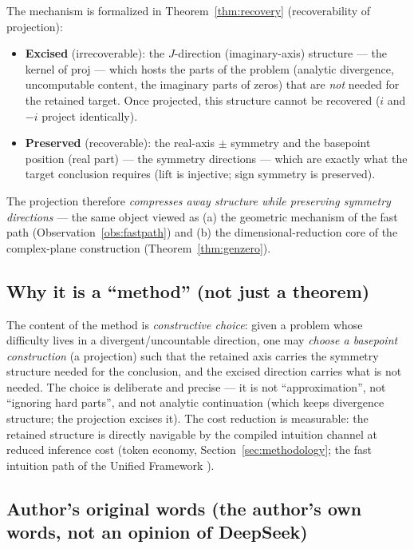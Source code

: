 \documentclass[11pt]{article}
\theoremstyle{remark}
\begin{document}
The mechanism is formalized in Theorem~\ref{thm:recovery} (recoverability of
projection):
\begin{itemize}
  \item \textbf{Excised} (irrecoverable): the $J$-direction (imaginary-axis)
        structure --- the kernel of $\mathrm{proj}$ --- which hosts the parts
        of the problem (analytic divergence, uncomputable content, the
        imaginary parts of zeros) that are \emph{not} needed for the retained
        target. Once projected, this structure cannot be recovered ($i$ and
        $-i$ project identically).
  \item \textbf{Preserved} (recoverable): the real-axis $\pm$ symmetry and
        the basepoint position (real part) --- the symmetry directions ---
        which are exactly what the target conclusion requires
        ($\mathrm{lift}$ is injective; sign symmetry is preserved).
\end{itemize}
The projection therefore \emph{compresses away structure while preserving
symmetry directions} --- the same object viewed as (a) the geometric
mechanism of the fast path (Observation~\ref{obs:fastpath}) and (b) the
dimensional-reduction core of the complex-plane construction
(Theorem~\ref{thm:genzero}).

\subsection{Why it is a ``method'' (not just a theorem)}

The content of the method is \emph{constructive choice}: given a problem
whose difficulty lives in a divergent/uncountable direction, one may
\emph{choose a basepoint construction} (a projection) such that the retained
axis carries the symmetry structure needed for the conclusion, and the
excised direction carries what is not needed. The choice is deliberate and
precise --- it is not ``approximation'', not ``ignoring hard parts'', and not
analytic continuation (which keeps divergence structure; the projection
excises it). The cost reduction is measurable: the retained structure is
directly navigable by the compiled intuition channel at reduced inference
cost (token economy, Section~\ref{sec:methodology}; the fast intuition path
of the Unified Framework \cite{uf-manifesto}).

\subsection{Author's original words (the author's own words, not an opinion of DeepSeek)}
\label{sec:wzy-original}
\end{document}
